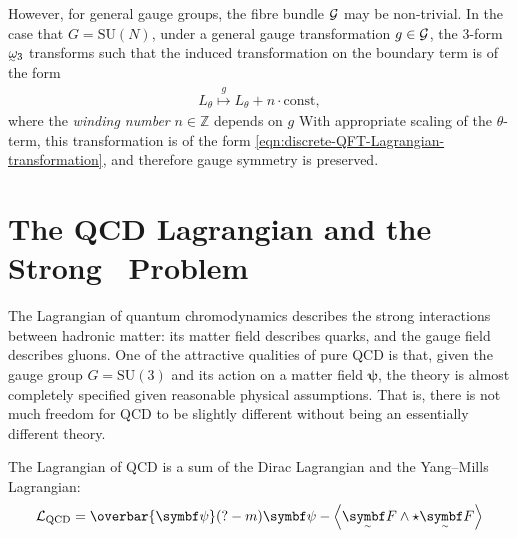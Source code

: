 \cite{Witten_1989}

However, for general gauge groups, the fibre bundle $\cal G$ may be non-trivial.
In the case that $G = \mathrm{SU}(N)$, under a general gauge transformation $g \in \cal G$, the 3-form $\csform$ transforms such that the induced transformation on the boundary term is of the form
\begin{align}
	L_\theta \overset{g}{\mapsto} L_\theta + n\cdot\text{const}
,\end{align}
where the \emph{winding number} $n \in \mathds Z$ depends on $g$ \cite[§\,1]{Witten_1989}
With appropriate scaling of the $\theta$-term, this transformation is of the form \eqref{eqn:discrete-QFT-Lagrangian-transformation}, and therefore gauge symmetry is preserved.





\section{The QCD Lagrangian and the Strong \CP\ Problem}

The Lagrangian of quantum chromodynamics describes the strong interactions between hadronic matter: its matter field describes quarks, and the gauge field describes gluons.
One of the attractive qualities of pure QCD is that, given the gauge group $G = \mathrm{SU}(3)$ and its action on a matter field $\bm\psi$, the theory is almost completely specified given reasonable physical assumptions.
That is, there is not much freedom for QCD to be slightly different without being an essentially different theory.

The Lagrangian of QCD is a sum of the Dirac Lagrangian and the Yang--Mills Lagrangian:
\begin{align}
	\cal L_\text{QCD} = \overbar{\bm\psi}\qty(? - m)\bm\psi - \ang{\tsbm F \wedge\star \tsbm F}
\end{align}


